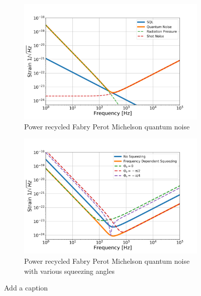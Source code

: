 	\begin{figure}[ht]
		\centering
		\begin{subfigure}[b]{0.5\textwidth}
			\centering
			\includegraphics[width=\textwidth]{../Figures/Kimble_PRFPMI_QM.png}
			\caption{Power recycled Fabry Perot Michelson quantum noise}
			\label{fig:kimble_PRFMI}
		\end{subfigure}
		\hfill
		\begin{subfigure}[b]{0.5\textwidth}
			\centering
			\includegraphics[width=\textwidth]{../Figures/Kimble_PRFPMI_QM_Sqz.png}
			\caption{Power recycled Fabry Perot Michelson quantum noise with various squeezing angles}
			\label{fig:kimble_PRFMI_sqz}
		\end{subfigure}
		\caption{Add a caption}
		\label{fig:PSD_PRFPMI}
	\end{figure}